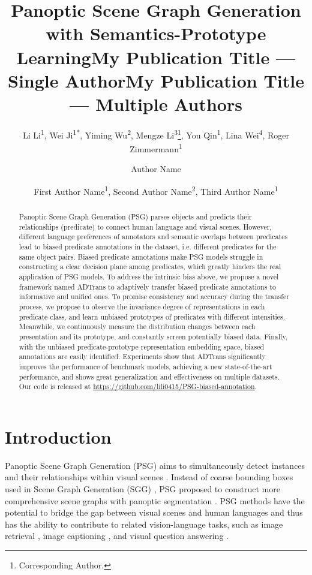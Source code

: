 \documentclass[letterpaper]{article} %
\title{Panoptic Scene Graph Generation with Semantics-Prototype Learning}
\author{
    Li Li\textsuperscript{\rm 1},
    Wei Ji\textsuperscript{\rm 1}\textsuperscript{*},
    Yiming Wu\textsuperscript{\rm 2},
    Mengze Li\textsuperscript{\rm 3}\thanks{Corresponding Author.},
    You Qin\textsuperscript{\rm 1},
    Lina Wei\textsuperscript{\rm 4},
    Roger Zimmermann\textsuperscript{\rm 1}
}
\title{My Publication Title --- Single Author}
\author {
    Author Name
}
\title{My Publication Title --- Multiple Authors}
\author {
    First Author Name\textsuperscript{\rm 1},
    Second Author Name\textsuperscript{\rm 2},
    Third Author Name\textsuperscript{\rm 1}
}
\begin{document}
\maketitle

\begin{abstract}
Panoptic Scene Graph Generation (PSG) parses objects and predicts their relationships (predicate) to connect human language and visual scenes.
However, different language preferences of annotators and semantic overlaps between predicates lead to biased predicate annotations in the dataset, i.e. different predicates for the same object pairs.
Biased predicate annotations make PSG models struggle in constructing a clear decision plane among predicates, which greatly hinders the real application of PSG models.
To address the intrinsic bias above, we propose a novel framework named ADTrans to adaptively transfer biased predicate annotations to informative and unified ones. To promise consistency and accuracy during the transfer process, we propose to observe the invariance degree of representations in each predicate class, and learn unbiased prototypes of predicates with different intensities. Meanwhile, we continuously measure the distribution changes between each presentation and its prototype, and constantly screen potentially biased data. Finally, with the unbiased predicate-prototype representation embedding space, biased annotations are easily identified.
Experiments show that ADTrans significantly improves the performance of benchmark models, achieving a new state-of-the-art performance, and shows great generalization and effectiveness on multiple datasets. Our code is released at \url{https://github.com/lili0415/PSG-biased-annotation}.
\end{abstract}

\section{Introduction}
Panoptic Scene Graph Generation (PSG) \cite{yang2022psg} aims to simultaneously detect instances and their relationships within visual scenes \cite{Chang_2023}. Instead of coarse bounding boxes used in Scene Graph Generation (SGG) \cite{10.1145/3474085.3475540,Xu_2017_CVPR,Lin_2020_CVPR,Li_2021_CVPR,pmlr-v119-chen20j,yao2022pevl,https://doi.org/10.48550/arxiv.2109.11797}, PSG proposed to construct more comprehensive scene graphs with panoptic segmentation \cite{Kirillov_2019_CVPR}. %
PSG methods have the potential to bridge the gap between visual scenes and human languages and thus has the ability to contribute to related vision-language tasks, such as image retrieval \cite{Johnson_2015_CVPR,wang2022global,wang2022recognition,lv2023duet}, image captioning \cite{Chen_2020_CVPR,Wei_Chen_Ji_Yue_Chua_2022}, and visual question answering \cite{Teney_2017_CVPR,Li_2022_CVPR,Antol_2015_ICCV,xiao2021video,fang2023you}.
\end{document}
